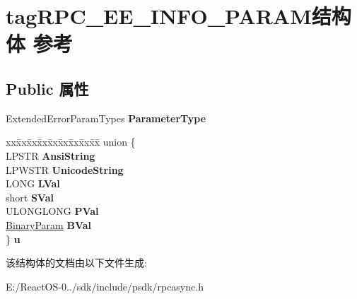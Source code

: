 \hypertarget{structtag_r_p_c___e_e___i_n_f_o___p_a_r_a_m}{}\section{tag\+R\+P\+C\+\_\+\+E\+E\+\_\+\+I\+N\+F\+O\+\_\+\+P\+A\+R\+A\+M结构体 参考}
\label{structtag_r_p_c___e_e___i_n_f_o___p_a_r_a_m}
\subsection*{Public 属性}
\begin{DoxyCompactItemize}
\item 
\mbox{\label{structtag_r_p_c___e_e___i_n_f_o___p_a_r_a_m_a17d249f0ff8040eaee9a08cea761a768}} 
Extended\+Error\+Param\+Types {\bfseries Parameter\+Type}
\item 
\mbox{\label{structtag_r_p_c___e_e___i_n_f_o___p_a_r_a_m_af894ab35314fe8e90fa3f7849cbceb35}} 
\begin{tabbing}
xx\=xx\=xx\=xx\=xx\=xx\=xx\=xx\=xx\=\kill
union \{\\
\>LPSTR {\bfseries AnsiString}\\
\>LPWSTR {\bfseries UnicodeString}\\
\>LONG {\bfseries LVal}\\
\>short {\bfseries SVal}\\
\>ULONGLONG {\bfseries PVal}\\
\>\hyperlink{structtag_binary_param}{BinaryParam} {\bfseries BVal}\\
\} {\bfseries u}\\

\end{tabbing}\end{DoxyCompactItemize}


该结构体的文档由以下文件生成\+:\begin{DoxyCompactItemize}
\item 
E\+:/\+React\+O\+S-\/0../sdk/include/psdk/rpcasync.\+h\end{DoxyCompactItemize}
